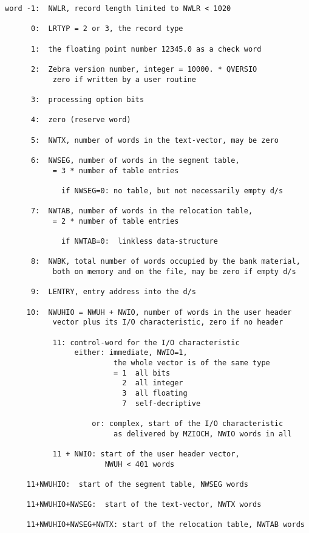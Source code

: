 \begin{verbatim}
word -1:  NWLR, record length limited to NWLR < 1020

      0:  LRTYP = 2 or 3, the record type

      1:  the floating point number 12345.0 as a check word

      2:  Zebra version number, integer = 10000. * QVERSIO
           zero if written by a user routine

      3:  processing option bits

      4:  zero (reserve word)

      5:  NWTX, number of words in the text-vector, may be zero

      6:  NWSEG, number of words in the segment table,
           = 3 * number of table entries

             if NWSEG=0: no table, but not necessarily empty d/s

      7:  NWTAB, number of words in the relocation table,
           = 2 * number of table entries

             if NWTAB=0:  linkless data-structure

      8:  NWBK, total number of words occupied by the bank material,
           both on memory and on the file, may be zero if empty d/s

      9:  LENTRY, entry address into the d/s

     10:  NWUHIO = NWUH + NWIO, number of words in the user header
           vector plus its I/O characteristic, zero if no header

           11: control-word for the I/O characteristic
                either: immediate, NWIO=1,
                         the whole vector is of the same type
                         = 1  all bits
                           2  all integer
                           3  all floating
                           7  self-decriptive

                    or: complex, start of the I/O characteristic
                         as delivered by MZIOCH, NWIO words in all

           11 + NWIO: start of the user header vector,
                       NWUH < 401 words

     11+NWUHIO:  start of the segment table, NWSEG words

     11+NWUHIO+NWSEG:  start of the text-vector, NWTX words

     11+NWUHIO+NWSEG+NWTX: start of the relocation table, NWTAB words
\end{verbatim}

